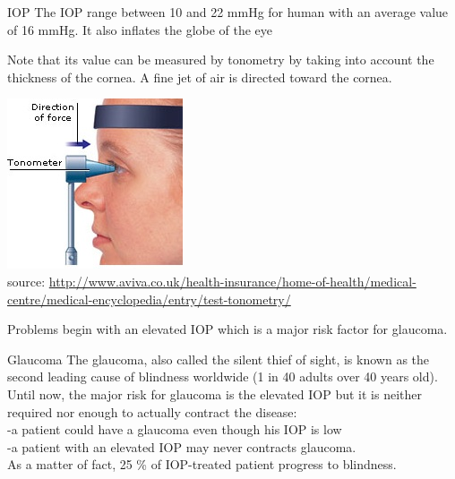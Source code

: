 \documentclass[9pt]{beamer}
\begin{document}
\begin{frame}{IOP}
The IOP range between 10 and 22 mmHg for human with an average value of 16 mmHg.
It also inflates the globe of the eye

Note that its value can be measured by tonometry by taking into account the thickness of the cornea. A fine jet of air is directed toward the cornea.
\begin{center}
\includegraphics[scale=.6]{Tonometry.jpg}\\
\tiny{source: \url{http://www.aviva.co.uk/health-insurance/home-of-health/medical-centre/medical-encyclopedia/entry/test-tonometry/}}
\end{center}
Problems begin with an elevated IOP which is a major risk factor for glaucoma.
\end{frame}

\begin{frame}{Glaucoma}
The glaucoma, also called the silent thief of sight, is known as the second leading cause of blindness worldwide (1 in 40 adults over 40 years old).
\newline
\\
 Until now, the major risk for glaucoma is the elevated IOP but it is neither required nor enough to actually contract the disease:\\
-a patient could have a glaucoma even though his IOP is low\\
-a patient with an elevated IOP may never contracts glaucoma. \\
As a matter of fact, 25 \% of IOP-treated patient progress to blindness.

\end{frame}
\end{document}
